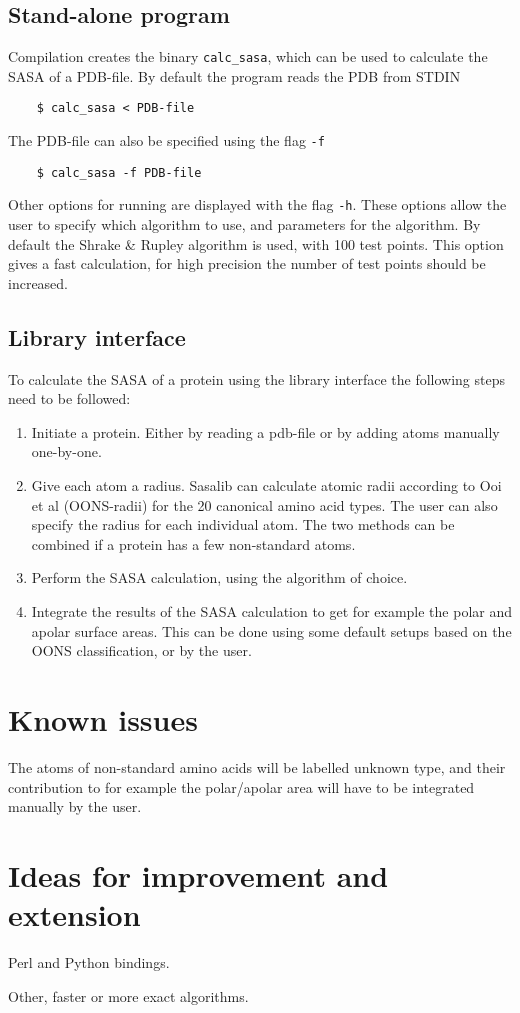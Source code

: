 \documentclass[a4paper,11pt]{article}
\begin{document}
\subsection{Stand-alone program}

Compilation creates the binary \texttt{calc\_sasa}, which can be used
to calculate the SASA of a PDB-file. By default the program reads the
PDB from STDIN
\begin{verbatim} 
    $ calc_sasa < PDB-file    
\end{verbatim}
The PDB-file can also be specified using the flag \texttt{-f}
\begin{verbatim}
    $ calc_sasa -f PDB-file
\end{verbatim}
Other options for running are displayed with the flag
\texttt{-h}. These options allow the user to specify which algorithm
to use, and parameters for the algorithm. By default the Shrake \&
Rupley algorithm is used, with 100 test points. This option gives a
fast calculation, for high precision the number of test points should
be increased.
 
\subsection{Library interface}

To calculate the SASA of a protein using the library interface the
following steps need to be followed:
\begin{enumerate}
  \item Initiate a protein. Either by reading a pdb-file or by adding
    atoms manually one-by-one.
  \item Give each atom a radius. Sasalib can calculate atomic radii
    according to Ooi et al (OONS-radii) for the 20 canonical amino
    acid types. The user can also specify the radius for each
    individual atom. The two methods can be combined if a protein has
    a few non-standard atoms.
  \item Perform the SASA calculation, using the algorithm of choice.
  \item Integrate the results of the SASA calculation to get for
    example the polar and apolar surface areas. This can be done using
    some default setups based on the OONS classification, or by the
    user.
\end{enumerate}

\section{Known issues}

The atoms of non-standard amino acids will be labelled unknown type,
and their contribution to for example the polar/apolar area will have
to be integrated manually by the user.

\section{Ideas for improvement and extension}

Perl and Python bindings.

Other, faster or more exact algorithms.
\end{document}
